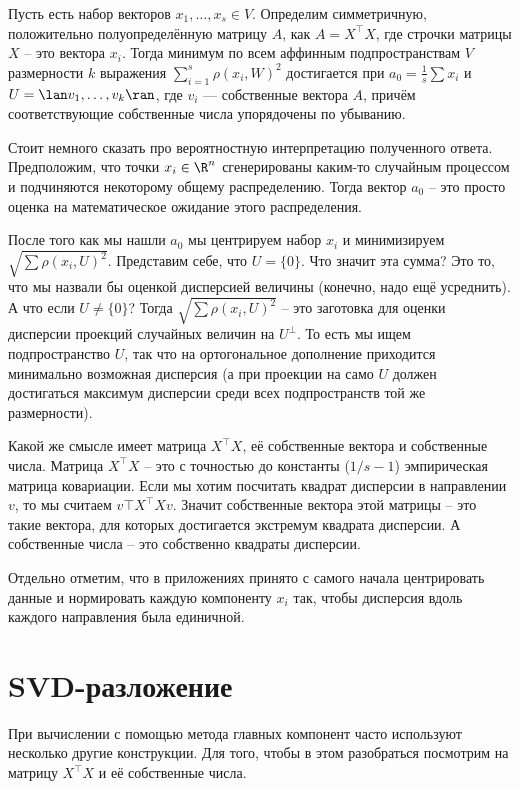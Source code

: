 \thrm  Пусть есть набор векторов $x_1,\dots,x_s \in V$. Определим симметричную, положительно полуопределённую матрицу $A$, как $A=X^{\top}X$, где строчки матрицы $X$ -- это вектора $x_i$. Тогда минимум по всем аффинным подпространствам $V$ размерности $k$ выражения $\sum_{i=1}^s \rho(x_i,W)^2$ достигается при $a_0=\frac{1}{s}\sum x_i$  и $U=\lan v_1,\dots,v_k\ran$, где $v_i$ --- собственные вектора $A$, причём соответствующие собственные числа упорядочены по убыванию. 
\ethrm

\rm Стоит немного сказать про вероятностную интерпретацию полученного ответа. Предположим, что точки $x_i\in \R^n$ сгенерированы каким-то случайным процессом и подчиняются некоторому общему распределению. Тогда вектор $a_0$ -- это просто оценка на математическое ожидание этого распределения.

После того как мы нашли $a_0$ мы центрируем набор $x_i$ и минимизируем $\sqrt{\sum \rho (x_i, U)^2}$. Представим себе, что $U=\{0\}$. Что значит эта сумма? Это то, что мы назвали бы оценкой дисперсией величины (конечно, надо ещё усреднить). 
А что если $U \neq \{0\}$? Тогда $\sqrt{\sum \rho (x_i, U)^2}$ -- это заготовка для оценки дисперсии проекций случайных величин на $U^\bot$. То есть мы ищем подпространство $U$, так что на ортогональное дополнение приходится минимально возможная дисперсия (а при проекции на само $U$ должен достигаться максимум дисперсии среди всех подпространств той же размерности).

Какой же смысле имеет матрица $X^\top X$, её собственные вектора и собственные числа. Матрица $X^\top X$ -- это с точностью до константы ($1/s-1$) эмпирическая матрица ковариации. Если мы хотим посчитать квадрат дисперсии в направлении $v$, то мы считаем $v\top X^\top X v$. Значит собственные вектора этой матрицы -- это такие вектора, для которых достигается экстремум квадрата дисперсии. А собственные числа -- это собственно квадраты дисперсии.
\erm

\rm Отдельно отметим, что в приложениях принято с самого начала центрировать данные и нормировать каждую компоненту $x_i$ так, чтобы дисперсия вдоль каждого направления была единичной.
\erm



\section{SVD-разложение}

При вычислении с помощью метода главных компонент часто используют несколько другие конструкции. Для того, чтобы в этом разобраться посмотрим на матрицу  $X^{\top}X$  и её собственные числа.  

